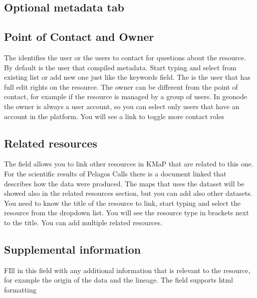 \documentclass[letterpaper,10pt,english]{sphinxmanual}
\begin{document}
\subsection{Optional metadata tab}
\label{\detokenize{03_managing_metadata:optional-metadata-tab}}

\subsection{Point of Contact and Owner}
\label{\detokenize{03_managing_metadata:point-of-contact-and-owner}}
\sphinxAtStartPar
The  identifies the user or the users to contact for questions about the resource. By default is the user that compiled metadata.
Start typing and select from existing list or add new one just like the keywords field.
The  is the user that has full edit rights on the resource. The owner can be different from the point of contact, for example if the resource is managed by a group of users.
In geonode the owner is always a user account, so you can select only users that have an account in the platform.
You will see a link to toggle more contact roles


\subsection{Related resources}
\label{\detokenize{03_managing_metadata:related-resources}}
\sphinxAtStartPar
The  field allows you to link other resources in KMaP that are related to this one.
For the scientific results of Pelagos Calls there is a document linked that describes how the data were produced.
The maps that uses the dataset will be showed also in the related resources section, but you can add also other datasets.
You need to know the title of the resource to link, start typing and select the resource from the dropdown list.
You will see the resource type in brackets next to the title. You can add multiple related resources.


\subsection{Supplemental information}
\label{\detokenize{03_managing_metadata:supplemental-information}}
\sphinxAtStartPar
FIll in this field with any additional information that is relevant to the resource,
for example the origin of the data and the lineage.
The field supports html formatting
\end{document}
